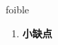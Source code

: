 
\begin{frame}
{\huge foible}
\begin{center}
\begin{enumerate}\Large
  \item \textbf{小缺点}
\end{enumerate}
\end{center}
\end{frame}
